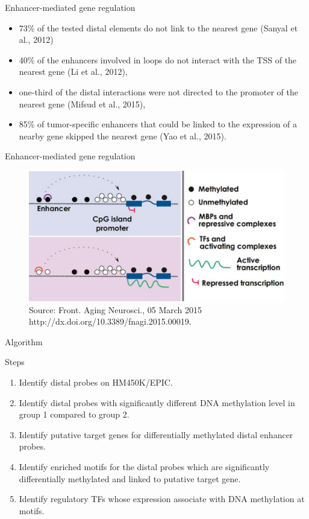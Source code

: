\documentclass[slidestop,compress,11pt,xcolor=dvipsnames]{beamer}
\begin{document}
\begin{frame}{Enhancer-mediated gene regulation}
 \begin{itemize}
  \item 73\% of the tested distal elements do not link to the nearest gene (Sanyal et al., 2012)
  \item 40\% of the enhancers involved in loops do not interact with the TSS of the nearest gene (Li et al., 2012),
  \item one-third of the distal interactions were not directed to the promoter of the nearest gene (Mifsud et al., 2015),
  \item 85\% of tumor-specific enhancers that could be linked to the expression of a nearby gene skipped the nearest gene (Yao et al., 2015).
 \end{itemize}
\end{frame}

\begin{frame}{Enhancer-mediated gene regulation}
 \vspace*{-0.1cm}
 \begin{figure}
  \centering
  \includegraphics[width=1.0\linewidth]{ELMER/dna_met.png}{\tiny{\\Source: Front. Aging Neurosci., 05 March 2015 http://dx.doi.org/10.3389/fnagi.2015.00019.}}
 \end{figure}
\end{frame}




\begin{frame}{Algorithm}

\begin{exampleblock}{Steps}
\begin{enumerate}
\item  Identify distal probes on HM450K/EPIC.
\item  Identify distal probes with significantly different DNA methylation level in  group 1 compared to group 2.
\item  Identify putative target genes for differentially methylated distal enhancer probes.
\item  Identify enriched motifs for the distal  probes which are significantly differentially methylated and linked to putative target gene.
\item  Identify regulatory TFs whose expression associate with DNA methylation at motifs.
\end{enumerate}

\end{exampleblock}
\end{frame}
\end{document}
